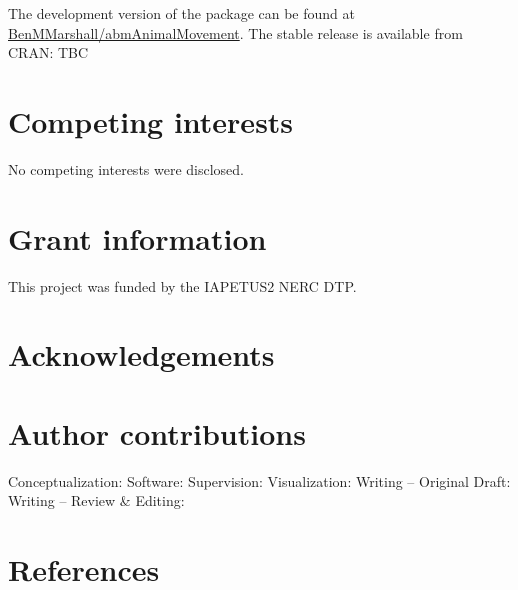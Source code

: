 \documentclass[10pt,a4paper]{article}
\begin{document}
The development version of the package can be found at \href{https://github.com/BenMMarshall/abmAnimalMovement}{BenMMarshall/abmAnimalMovement}.
The stable release is available from CRAN: TBC

\hypertarget{competing-interests}{%
\section{Competing interests}\label{competing-interests}}

No competing interests were disclosed.

\hypertarget{grant-information}{%
\section{Grant information}\label{grant-information}}

This project was funded by the IAPETUS2 NERC DTP.

\hypertarget{acknowledgements}{%
\section{Acknowledgements}\label{acknowledgements}}

\hypertarget{author-contributions}{%
\section{Author contributions}\label{author-contributions}}

Conceptualization:
Software:
Supervision:
Visualization:
Writing -- Original Draft:
Writing -- Review \& Editing:

\hypertarget{references}{%
\section*{References}\label{references}}
\end{document}

